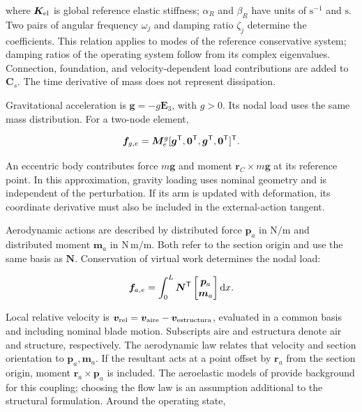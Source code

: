 where $\bm K_{\rm el}$ is global reference elastic stiffness; $\alpha_R$ and $\beta_R$ have units of $\mathrm{s^{-1}}$ and $\mathrm{s}$. Two pairs of angular frequency $\omega_j$ and damping ratio $\zeta_j$ determine the coefficients. This relation applies to modes of the reference conservative system; damping ratios of the operating system follow from its complex eigenvalues. Connection, foundation, and velocity-dependent load contributions are added to $\bm C_s$. The time derivative of mass does not represent dissipation.

Gravitational acceleration is $\bm g=-g\bm E_3$, with $g>0$. Its nodal load uses the same mass distribution. For a two-node element,

\begin{equation}
\bm f_{g,e}=\bm M_e^g[\bm g^\mathsf T,\bm0^\mathsf T,\bm g^\mathsf T,\bm0^\mathsf T]^\mathsf T.
\end{equation}

An eccentric body contributes force $m\bm g$ and moment $\bm r_C\times m\bm g$ at its reference point. In this approximation, gravity loading uses nominal geometry and is independent of the perturbation. If its arm is updated with deformation, its coordinate derivative must also be included in the external-action tangent.

Aerodynamic actions are described by distributed force $\bm p_a$ in $\mathrm{N/m}$ and distributed moment $\bm m_a$ in $\mathrm{N\,m/m}$. Both refer to the section origin and use the same basis as $\bm N$. Conservation of virtual work determines the nodal load:

\begin{equation}
\bm f_{a,e}=\int_0^L\bm N^\mathsf T
\begin{bmatrix}\bm p_a\\\bm m_a\end{bmatrix}\mathrm d x.
\end{equation}

Local relative velocity is $\bm v_{\rm rel}=\bm v_{\rm aire}-\bm v_{\rm estructura}$, evaluated in a common basis and including nominal blade motion. Subscripts $\mathrm{aire}$ and $\mathrm{estructura}$ denote air and structure, respectively. The aerodynamic law relates that velocity and section orientation to $\bm p_a,\bm m_a$. If the resultant acts at a point offset by $\bm r_a$ from the section origin, moment $\bm r_a\times\bm p_a$ is included. The aeroelastic models of \citet{maza2014} provide background for this coupling; choosing the flow law is an assumption additional to the structural formulation. Around the operating state,

